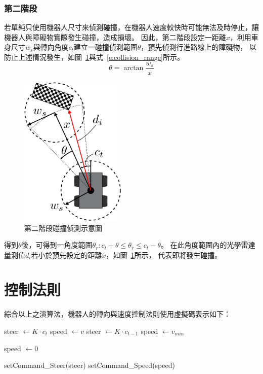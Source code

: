 \subsubsection{第二階段}
若單純只使用機器人尺寸來偵測碰撞，在機器人速度較快時可能無法及時停止，讓機器人與障礙物實際發生碰撞，造成損壞。
因此，第二階段設定一距離$x$，利用車身尺寸$w_s$與轉向角度$c_t$建立一碰撞偵測範圍$\theta$，預先偵測行進路線上的障礙物，
以防止上述情況發生，如圖~\ref{f:collision_2stage}與式~\ref{e:collision_range}所示。
\begin{equation}
	\theta = \arctan{\frac{w_s}{x}}
	\label{e:collision_range}
\end{equation}
\begin{figure}[h!]
	\centering
	\includegraphics[width=0.45\textwidth]{figures/algorithm/collision_2stage}
	\caption{第二階段碰撞偵測示意圖}
	\label{f:collision_2stage}
\end{figure}

得到$\theta$後，可得到一角度範圍$\theta_r : c_t + \theta \leq \theta_r \leq c_t - \theta$。
在此角度範圍內的光學雷達量測值$d_i$若小於預先設定的距離$x$，如圖~\ref{f:collision_2stage}所示，
代表即將發生碰撞。

\section{控制法則}
綜合以上之演算法，機器人的轉向與速度控制法則使用虛擬碼表示如下：
\begin{center}
	\begin{algorithmic}[H]
			\State \textrm{steer} $\gets K \cdot c_t$
			\State \textrm{speed} $\gets v$
		\Else
			\State \textrm{steer} $\gets K \cdot c_{t-1}$
			\State \textrm{speed} $\gets v_{min}$
		\EndIf

			\State \textrm{speed} $\gets 0$
		\EndIf

		\State \textrm{setCommand\_Steer(steer)}
		\State \textrm{setCommand\_Speed(speed)}
	\end{algorithmic}
\end{center}
